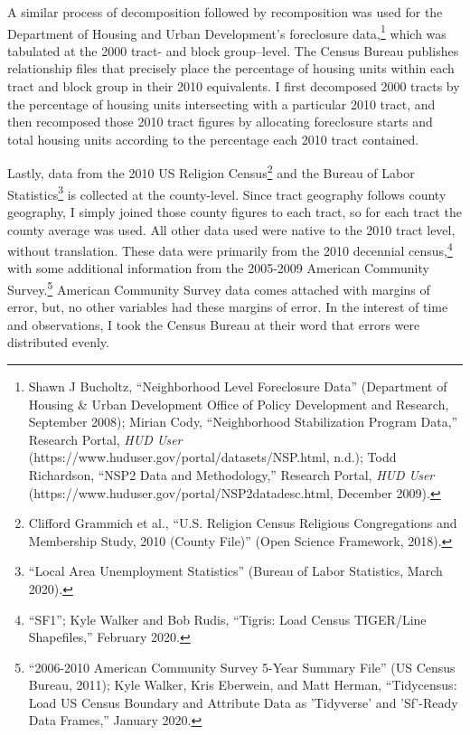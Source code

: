\documentclass[12pt,oneside]{psthesis}
\begin{document}
A similar process of decomposition followed by recomposition was used for the Department of Housing and Urban Development's foreclosure data,\footnote{Shawn J Bucholtz, ``Neighborhood Level Foreclosure Data'' (Department of Housing \& Urban Development Office of Policy Development and Research, September 2008); Mirian Cody, ``Neighborhood Stabilization Program Data,'' Research Portal, \emph{HUD User} (https://www.huduser.gov/portal/datasets/NSP.html, n.d.); Todd Richardson, ``NSP2 Data and Methodology,'' Research Portal, \emph{HUD User} (https://www.huduser.gov/portal/NSP2datadesc.html, December 2009).} which was tabulated at the 2000 tract- and block group--level.
The Census Bureau publishes relationship files that precisely place the percentage of housing units within each tract and block group in their 2010 equivalents.
I first decomposed 2000 tracts by the percentage of housing units intersecting with a particular 2010 tract, and then recomposed those 2010 tract figures by allocating foreclosure starts and total housing units according to the percentage each 2010 tract contained.

Lastly, data from the 2010 US Religion Census\footnote{Clifford Grammich et al., ``U.S. Religion Census Religious Congregations and Membership Study, 2010 (County File)'' (Open Science Framework, 2018).} and the Bureau of Labor Statistics\footnote{``Local Area Unemployment Statistics'' (Bureau of Labor Statistics, March 2020).} is collected at the county-level.
Since tract geography follows county geography, I simply joined those county figures to each tract, so for each tract the county average was used.
All other data used were native to the 2010 tract level, without translation.
These data were primarily from the 2010 decennial census,\footnote{``SF1''; Kyle Walker and Bob Rudis, ``Tigris: Load Census TIGER/Line Shapefiles,'' February 2020.} with some additional information from the 2005-2009 American Community Survey.\footnote{``2006-2010 American Community Survey 5-Year Summary File'' (US Census Bureau, 2011); Kyle Walker, Kris Eberwein, and Matt Herman, ``Tidycensus: Load US Census Boundary and Attribute Data as 'Tidyverse' and 'Sf'-Ready Data Frames,'' January 2020.}
American Community Survey data comes attached with margins of error, but, no other variables had these margins of error.
In the interest of time and observations, I took the Census Bureau at their word that errors were distributed evenly.
\end{document}
